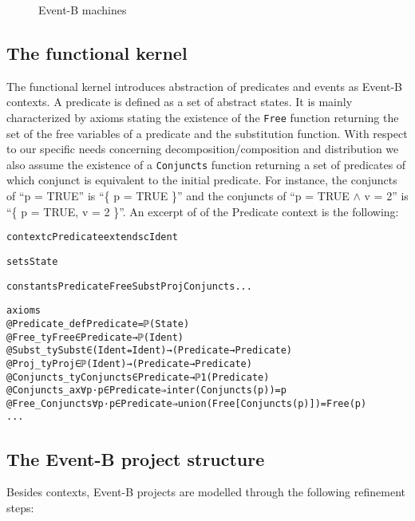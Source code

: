 \documentclass{llncs}
\begin{document}
\begin{figure}[hbt]
\centering
{}
\caption{Event-B machines}
\label{mch}
\end{figure}

%
    \subsection{The functional kernel}

           The functional kernel introduces abstraction of predicates and events as Event-B contexts.
A predicate is defined as a set of abstract states. It is mainly characterized by axioms stating the existence
of the \texttt{Free} function returning the set of the free variables of a predicate and the substitution
function. With respect to our specific needs concerning decomposition/composition and distribution
we also assume the existence of a \texttt{Conjuncts} function returning a set of  predicates of which conjunct
is equivalent to the initial predicate.  For instance, the conjuncts of ``p = TRUE'' is ``\{ p = TRUE \}'' and the
conjuncts of   ``p = TRUE $\wedge$ v = 2'' is ``\{ p = TRUE, v = 2 \}''.
An excerpt of of the Predicate context is the following:

\begin{framed}
\begin{small}
\begin{alltt} 
context cPredicate extends cIdent

sets State

constants Predicate Free Subst Proj Conjuncts ...

axioms
  @Predicate_def Predicate = ℙ(State)
  @Free_ty Free ∈ Predicate → ℙ(Ident)
  @Subst_ty Subst ∈ (Ident ⇸ Ident) → (Predicate → Predicate)
  @Proj_ty Proj ∈ ℙ(Ident) → (Predicate → Predicate)
  @Conjuncts_ty Conjuncts ∈ Predicate → ℙ1(Predicate)
  @Conjuncts_ax ∀ p· p ∈ Predicate ⇒  inter(Conjuncts(p)) = p
  @Free_Conjuncts ∀ p· p ∈ Predicate ⇒  union(Free[Conjuncts(p)]) = Free(p)
 ...
\end{alltt}
\end{small}
\end{framed}


    \subsection{The Event-B project structure}

Besides contexts, Event-B projects are modelled through the following
refinement steps:
\end{document}
